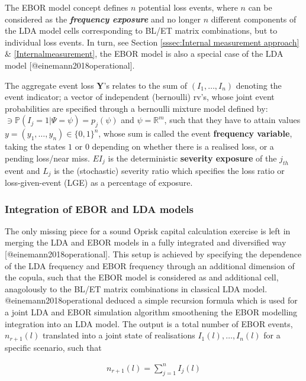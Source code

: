 \documentclass[]{article}
\begin{document}
The EBOR model concept defines \(n\) potential loss events, where \(n\)
can be considered as the \emph{\textbf{frequency exposure}} and no
longer \(n\) different components of the LDA model cells corresponding
to BL/ET matrix combinations, but to individual loss events. In turn,
see Section \ref{sssec:Internal measurement approach} \&
\ref{Internalmeasurement}, the EBOR model is also a special case of the
LDA model {[}@einemann2018operational{]}.\medskip

The aggregate event loss \(\mathbf{Y}\)'s relates to the sum of
\((I_1,\ldots,I_n)\) denoting the event indicator; a vector of
independent (bernoulli) rv's, whose joint event probabilities are
specified through a bernoulli mixture model defined by:
\(\ni \mathbb{P}(I_j=1|\Psi=\psi)=p_j(\psi)\) and \(\psi=\mathbb{R}^m\),
such that they have to attain values
\(y=(y_1,\ldots,y_n) \in \{0,1\}^n\), whose sum is called the event
\textbf{frequency variable}, taking the states \(1\) or \(0\) depending
on whether there is a realised loss, or a pending loss/near miss.
\(EI_j\) is the deterministic \textbf{severity exposure} of the
\(j_{th}\) event and \(L_j\) is the (stochastic) severity ratio which
specifies the loss ratio or loss-given-event (LGE) as a percentage of
exposure.

\subsubsection{Integration of EBOR and LDA models}

The only missing piece for a sound Oprisk capital calculation exercise
is left in merging the LDA and EBOR models in a fully integrated and
diversified way {[}@einemann2018operational{]}. This setup is achieved
by specifying the dependence of the LDA frequency and EBOR frequency
through an additional dimension of the copula, such that the EBOR model
is considered as and additional cell, anagolously to the BL/ET matrix
combinations in classical LDA model. @einemann2018operational deduced a
simple recursion formula which is used for a joint LDA and EBOR
simulation algorithm smoothening the EBOR modelling integration into an
LDA model. The output is a total number of EBOR events, \(n_{r+1}(l)\)
translated into a joint state of realisations \(I_1(l),\ldots,I_n(l)\)
for a specific scenario, such that

\singlespacing

\begin{eqnarray}\label{EBORexposure}
n_{r+1}(l)=\sum_{j=1}^n I_j(l)
\end{eqnarray} \doublespacing
\end{document}
